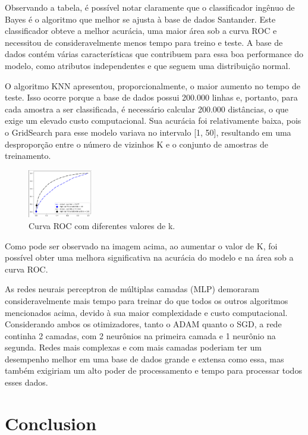 \documentclass[conference]{IEEEtran}
\begin{document}
Observando a tabela, é possível notar claramente que o classificador ingênuo de Bayes é o algoritmo que melhor se ajusta à base de dados Santander. Este classificador obteve a melhor acurácia, uma maior área sob a curva ROC e necessitou de consideravelmente menos tempo para treino e teste. A base de dados contém várias características que contribuem para essa boa performance do modelo, como atributos independentes e que seguem uma distribuição normal.

O algoritmo KNN apresentou, proporcionalmente, o maior aumento no tempo de teste. Isso ocorre porque a base de dados possui 200.000 linhas e, portanto, para cada amostra a ser classificada, é necessário calcular 200.000 distâncias, o que exige um elevado custo computacional. Sua acurácia foi relativamente baixa, pois o GridSearch para esse modelo variava no intervalo [1, 50], resultando em uma desproporção entre o número de vizinhos K e o conjunto de amostras de treinamento. 

\begin{figure}[htbp]
\centerline{\includegraphics[width=0.25\textwidth]{knn_diff.png}}
\caption{Curva ROC com diferentes valores de k.}
\label{fig}
\end{figure}

Como pode ser observado na imagem acima, ao aumentar o valor de K, foi possível obter uma melhora significativa na acurácia do modelo e na área sob a curva ROC.

As redes neurais perceptron de múltiplas camadas (MLP) demoraram consideravelmente mais tempo para treinar do que todos os outros algoritmos mencionados acima, devido à sua maior complexidade e custo computacional. Considerando ambos os otimizadores, tanto o ADAM quanto o SGD, a rede continha 2 camadas, com 2 neurônios na primeira camada e 1 neurônio na segunda. Redes mais complexas e com mais camadas poderiam ter um desempenho melhor em uma base de dados grande e extensa como essa, mas também exigiriam um alto poder de processamento e tempo para processar todos esses dados.

\section{Conclusion}
\end{document}
